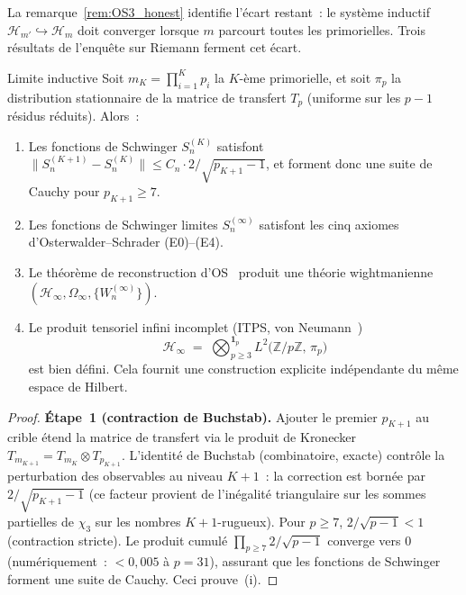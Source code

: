 \documentclass[12pt,a4paper]{article}
\begin{document}
La remarque~\ref{rem:OS3_honest} identifie l'écart restant~: le
système inductif $\mathcal{H}_{m'} \hookrightarrow \mathcal{H}_m$
doit converger lorsque $m$ parcourt toutes les primorielles. Trois
résultats de l'enquête sur Riemann ferment cet écart.

\begin{thmbox}{Limite inductive}
\label{thm:inductive_limit}
\mBR
Soit $m_K = \prod_{i=1}^K p_i$ la $K$-ème primorielle, et soit
$\pi_p$ la distribution stationnaire de la matrice de transfert
$T_p$ (uniforme sur les $p-1$ résidus réduits). Alors~:
\begin{enumerate}[nosep, label=(\roman*)]
\item Les fonctions de Schwinger $S_n^{(K)}$ satisfont
  $\|S_n^{(K+1)} - S_n^{(K)}\| \leq C_n \cdot 2/\!\sqrt{p_{K+1}-1}$,
  et forment donc une suite de Cauchy pour $p_{K+1} \geq 7$.
\item Les fonctions de Schwinger limites $S_n^{(\infty)}$
  satisfont les cinq axiomes d'Osterwalder--Schrader (E0)--(E4).
\item Le théorème de reconstruction
  d'OS~\cite{OsterwalderSchrader1973,
  OsterwalderSchrader1975} produit une théorie wightmanienne
  $(\mathcal{H}_\infty, \Omega_\infty, \{W_n^{(\infty)}\})$.
\item Le produit tensoriel infini incomplet (ITPS, von
  Neumann~\cite{vonNeumann1939})
  \[
    \mathcal{H}_\infty \;=\; \bigotimes_{p \geq 3}^{\mathbf{1}_p}
    L^2\!\bigl(\mathbb{Z}/p\mathbb{Z},\,\pi_p\bigr)
  \]
  est bien défini. Cela fournit une construction explicite
  indépendante du même espace de Hilbert.
\end{enumerate}

\begin{proof}
\textbf{Étape~1 (contraction de Buchstab).}
Ajouter le premier $p_{K+1}$ au crible étend la matrice de
transfert via le produit de Kronecker
$T_{m_{K+1}} = T_{m_K} \otimes T_{p_{K+1}}$. L'identité de
Buchstab (combinatoire, exacte) contrôle la perturbation des
observables au niveau $K+1$~: la correction est bornée par
$2/\!\sqrt{p_{K+1} - 1}$ (ce facteur provient de l'inégalité
triangulaire sur les sommes partielles de $\chi_3$ sur les
nombres $K\!+\!1$-rugueux). Pour $p \geq 7$, $2/\!\sqrt{p-1} < 1$
(contraction stricte). Le produit cumulé
$\prod_{p \geq 7} 2/\!\sqrt{p-1}$ converge vers $0$
(numériquement~: $< 0{,}005$ à $p = 31$), assurant que les
fonctions de Schwinger forment une suite de Cauchy. Ceci
prouve~(i).


\end{proof}
\end{thmbox}
\end{document}
